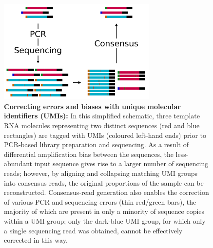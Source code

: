 \begin{figure}
\centering
\includegraphics[width=0.7\textwidth]{_Figures/png_edited/umi-consensus-schema}
\caption{\textbf{Correcting errors and biases with unique molecular identifiers (UMIs):} In this simplified schematic, three template RNA molecules representing two distinct sequences (red and blue rectangles) are tagged with UMIs (coloured left-hand ends) prior to PCR-based library preparation and sequencing. As a result of differential amplification bias between the sequences, the less-abundant input sequence gives rise to a larger number of sequencing reads; however, by aligning and collapsing matching UMI groups into consensus reads, the original proportions of the sample can be reconstructed. Consensus-read generation also enables the correction of various PCR and sequencing errors (thin red/green bars), the majority of which are present in only a minority of sequence copies within a UMI group; only the dark-blue UMI group, for which only a single sequencing read was obtained, cannot be effectively corrected in this way.}
\label{fig:umi-consensus-schema}
\end{figure}


